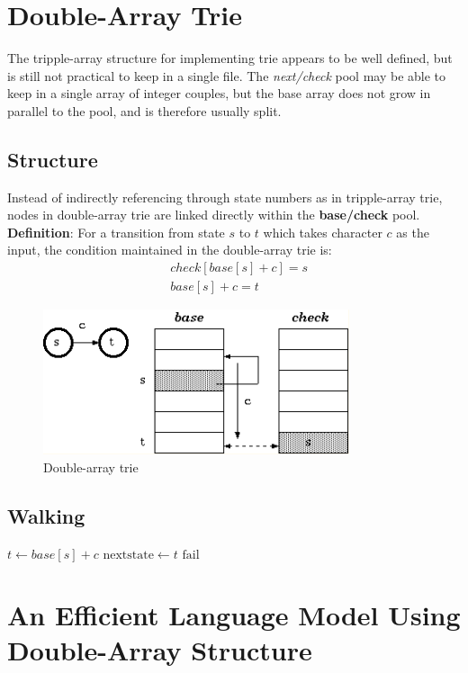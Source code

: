 \documentclass[a4paper, 12pt]{book} %
\begin{document}
\section{Double-Array Trie}
The tripple-array structure for implementing trie appears to be well defined, but is still not practical to keep in a single file. The \emph{next/check} pool may be able to keep in a single array of integer couples, but the base array does not grow in parallel to the pool, and is therefore usually split.

\subsection{Structure}
Instead of indirectly referencing through state numbers as in tripple-array trie, nodes in double-array trie are linked directly within the \textbf{base/check} pool.
\textbf{Definition}: For a transition from state $s$ to $t$ which takes character $c$ as the input, the condition maintained in the double-array trie is:\\
\begin{equation}
\begin{split}
& check[base[s]+c]=s \\
& base[s]+c=t
\end{split}
\end{equation}
\begin{figure}[htpb]
	\centering
	\includegraphics[width=9cm]{figures/double_array_trie.png}
	\caption{Double-array trie}
	\label{fig:boat1}
\end{figure}

\subsection{Walking}
\begin{algorithmic}
	\STATE $t\gets base[s] + c$
	\STATE $\mathrm{next state}\gets t$
	\ELSE
	\STATE $\mathrm{fail}$
	\ENDIF 
\end{algorithmic}


\section{An Efficient Language Model Using Double-Array Structure}
\end{document}
